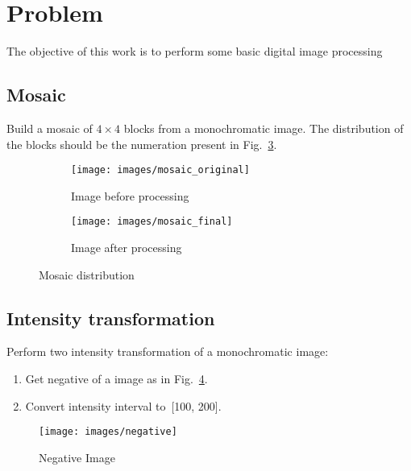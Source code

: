 \documentclass[journal]{IEEEtran}
\begin{document}




\maketitle

\section{Problem}
\label{sec:sec_1}
The objective of this work is to perform some basic digital image processing

\subsection{Mosaic}
\label{sub_sec:mosaic}
Build a mosaic of $4\times 4$  blocks from a monochromatic image. The distribution of the blocks should be the numeration present in Fig.~\ref{fig:mosaic_example}.

\begin{figure}[h]
	\centering
	\begin{subfigure}{0.20\textwidth}
		\centering
		\texttt{[image: images/mosaic\_original]} 
		\caption{Image before processing}
		\label{fig:subim1}
	\end{subfigure}
	\begin{subfigure}{0.20\textwidth}
		\centering
		\texttt{[image: images/mosaic\_final]}
		\caption{Image after processing}
		\label{fig:subim2}
	\end{subfigure}
	\caption{Mosaic distribution}
	\label{fig:mosaic_example}
\end{figure}

\subsection{Intensity transformation}
\label{sub_sec:transformation}
Perform two intensity transformation of a monochromatic image:
\begin{enumerate}
	\item Get negative of a image as in Fig.~\ref{fig:negative_image_example}.
	\item Convert intensity interval to~[100, 200].
\end{enumerate}
\begin{figure}[t]
	\centering
	\texttt{[image: images/negative]}
	\caption{Negative Image}
	\label{fig:negative_image_example}
\end{figure}
\end{document}
